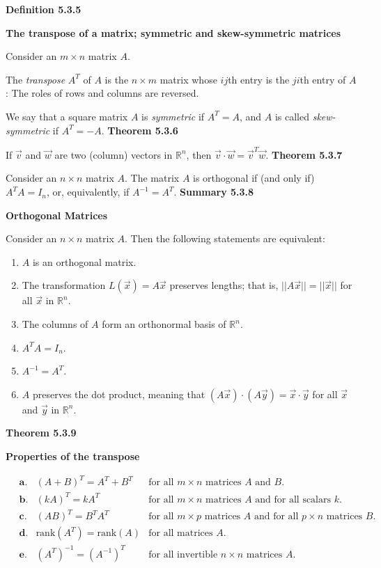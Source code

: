 \textbf{Definition 5.3.5}\\
\par\noindent\textbf{The transpose of a matrix; symmetric and skew-symmetric matrices}
\par\noindent Consider an $m\times{}n$ matrix $A$.
\par\noindent The \textit{transpose} $A^{T}$ of $A$ is the $n\times{}m$ matrix whose $ij$th entry is the $ji$th entry of $A$: The roles of rows and columns are reversed.
\par\noindent We say that a square matrix $A$ is \textit{symmetric} if $A^{T}=A$, and $A$ is called \textit{skew-symmetric} if $A^{T}=-A$.
\textbf{Theorem 5.3.6}\\
\par\noindent If $\vec{v}$ and $\vec{w}$ are two (column) vectors in $\mathbb{R}^{n}$, then $\vec{v}\cdot{}\vec{w}=\vec{v}^{T}\vec{w}$.
\textbf{Theorem 5.3.7}\\
\par\noindent Consider an $n\times{}n$ matrix $A$. The matrix $A$ is orthogonal if (and only if) $A^{T}A=I_{n}$, or, equivalently, if $A^{-1}=A^{T}$.
\textbf{Summary 5.3.8}\\
\par\noindent\textbf{Orthogonal Matrices}
\par\noindent Consider an $n\times{}n$ matrix $A$. Then the following statements are equivalent:
\renewcommand{\labelenumi}{\textbf{\roman{enumi}.}}
\begin{enumerate}
\item $A$ is an orthogonal matrix.
\item The transformation $L(\vec{x})=A\vec{x}$ preserves lengths; that is, $||A\vec{x}||=||\vec{x}||$ for all $\vec{x}$ in $\mathbb{R}^{n}$.
\item The columns of $A$ form an orthonormal basis of $\mathbb{R}^{n}$.
\item $A^{T}A=I_{n}$.
\item $A^{-1}=A^{T}$.
\item $A$ preserves the dot product, meaning that $(A\vec{x})\cdot{}(A\vec{y})=\vec{x}\cdot{}\vec{y}$ for all $\vec{x}$ and $\vec{y}$ in $\mathbb{R}^{n}$.
\end{enumerate}
\textbf{Theorem 5.3.9}\\
\par\noindent\textbf{Properties of the transpose}
\par\noindent $\displaystyle \quad\begin{array}{rll}\textbf{a.}&(A+B)^{T}=A^{T}+B^{T}&\textrm{for all }m\times{}n\textrm{ matrices }A\textrm{ and }B.\\{} \textbf{b.}&(kA)^{T}=kA^{T}&\textrm{for all }m\times{}n\textrm{ matrices }A\textrm{ and for all scalars }k.\\{} \textbf{c.}&(AB)^{T}=B^{T}A^{T}&\textrm{for all }m\times{}p\textrm{ matrices }A\textrm{ and for all }p\times{}n\textrm{ matrices }B.\\{} \textbf{d.}&\textrm{rank}(A^{T})=\textrm{rank}(A)&\textrm{for all matrices }A.\\{} \textbf{e.}&(A^{T})^{-1}=(A^{-1})^{T}&\textrm{for all invertible }n\times{}n\textrm{ matrices }A.\end{array}$

